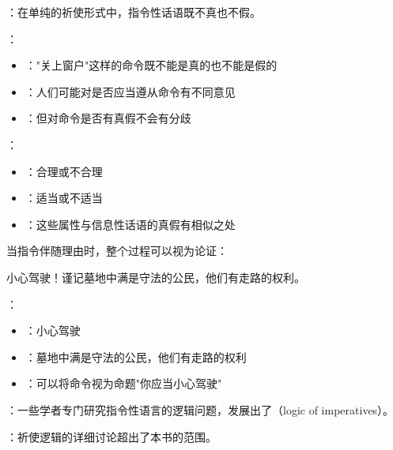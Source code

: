 \begin{theorembox}[title=指令性话语的真假问题]
：在单纯的祈使形式中，指令性话语既不真也不假。

：
\begin{itemize}
  \item {}："关上窗户"这样的命令既不能是真的也不能是假的
  \item {}：人们可能对是否应当遵从命令有不同意见
  \item {}：但对命令是否有真假不会有分歧
\end{itemize}

：
\begin{itemize}
  \item {}：合理或不合理
  \item {}：适当或不适当
  \item {}：这些属性与信息性话语的真假有相似之处
\end{itemize}
\end{theorembox}

\begin{examplebox}[title=指令性话语中的论证]
当指令伴随理由时，整个过程可以视为论证：

\begin{displayquote}
小心驾驶！谨记墓地中满是守法的公民，他们有走路的权利。\cite{lander1988}
\end{displayquote}

：
\begin{itemize}
  \item {}：小心驾驶
  \item {}：墓地中满是守法的公民，他们有走路的权利
  \item {}：可以将命令视为命题"你应当小心驾驶"
\end{itemize}
\end{examplebox}

\begin{theorembox}[title=祈使逻辑]
：一些学者专门研究指令性语言的逻辑问题，发展出了（logic of imperatives）。

：祈使逻辑的详细讨论超出了本书的范围。\cite{rescher1996}
\end{theorembox}

